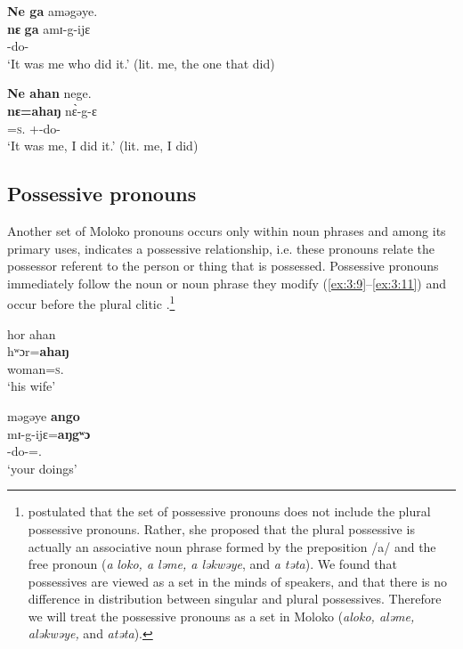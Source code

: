 \ea \label{ex:3:7}
\textbf{Ne  ga}  aməgəye.\\ 
\gll  \textbf{nɛ}  \textbf{ga}     amɪ-g-ijɛ \\
      {\oneS}   {\ADJ}    {\DEP}-do-{\CL}\\
\glt  ‘It was me who did it.’ (lit. me, the one that did)
\z

\ea \label{ex:3:8}
\textbf{Ne  ahan}  nege.\\
\gll  \textbf{nɛ}\textbf{=ahaŋ}     n\`{ɛ}-g-ɛ\\
      {\oneS}=\textsc{s}.{\POSS}  {\oneS}+{\PFV}-do-{\CL}\\
\glt  ‘It was me, I did it.’ (lit. me, I did)
\z

\subsection{Possessive pronouns}\label{sec:3.1.2}
\hypertarget{RefHeading1210861525720847}{}
\largerpage[2]
Another set of Moloko pronouns occurs only within noun phrases and among its primary uses, indicates a possessive relationship, i.e. these pronouns relate the possessor referent to the person or thing that is possessed. Possessive pronouns immediately follow the noun or noun phrase they modify (\ref{ex:3:9}--\ref{ex:3:11}) and occur before the plural clitic .\footnote{\citet{Bow1997c} postulated that the set of possessive pronouns does not include the plural possessive pronouns. Rather, she proposed that the plural possessive is actually an associative noun phrase formed by the preposition /a/ and the free pronoun (\textit{a} \textit{loko, a ləme, a ləkwəye}, and \textit{a təta}). We found that possessives are viewed as a set in the minds of speakers, and that there is no difference in distribution between singular and plural possessives. Therefore we will treat the possessive pronouns as a set in Moloko (\textit{aloko, aləme, aləkwəye, } and \textit{ atəta}). }  

\ea \label{ex:3:9}
hor  ahan\\
\gll  hʷɔr=\textbf{ahaŋ}\\
      woman=\textsc{s}.{\POSS}\\
\glt  ‘his wife’
\z

\ea \label{ex:3:10}
məgəye  \textbf{ango}\\
\gll  mɪ-g-ijɛ=\textbf{aŋgʷɔ}\\
      {\NOM}{}-do-{\CL}={\twoS}.{\POSS}\\
\glt  ‘your doings’
\z

